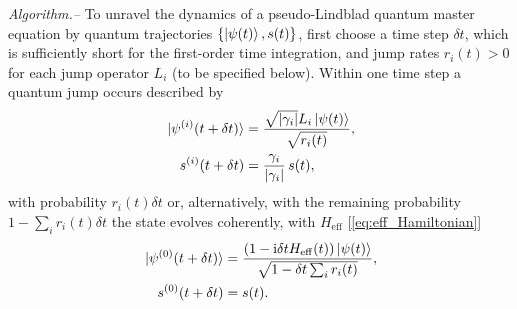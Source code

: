 \documentclass[twocolumn,prl,superscriptaddress]{revtex4-2}
\newcommand{\eff}{\mathrm{eff}}
\renewcommand{\i}{\mathrm i}
\begin{document}
\emph{Algorithm.--}
To unravel the dynamics of a pseudo-Lindblad quantum master equation by quantum trajectories $\{ \ket{\psi(t)} , s(t) \}$, first choose a time step $\delta t$, which is sufficiently short for the first-order time integration, and jump rates $r_i(t)>0$ for each jump operator $L_i$ (to be specified below). Within one time step a quantum jump occurs described by
\begin{align}
	\begin{aligned}
		\ket*{\psi^{(i)}(t+ \delta t)} &= \frac{\sqrt{|\gamma_i|} L_i \ket{\psi(t)}} {\sqrt{r_i(t)}} , \\
		s^{(i)}(t+ \delta t) &= \frac{\gamma_i}{|\gamma_i|}\, s(t),
		\label{eq:jump}
	\end{aligned}
\end{align} 
with probability $r_i(t)\delta t$
or, alternatively, with the remaining probability $1-\sum_i r_i(t)  \delta t$ the state evolves coherently, with $H_\mathrm{eff}$ [\cref{eq:eff_Hamiltonian}]  \cite{footnote_det}
\begin{align}
	\ket*{\psi^{(0)}(t+\delta t)} &= \frac{(1 -\i \delta t  H_\eff(t)) \ket{\psi(t)}}{\sqrt{1-\delta t \sum_i r_i(t)}} , 	\label{eq:stQTdet} \\
	s^{(0)}(t+\delta t)&=s(t).
\end{align} 
\end{document}

